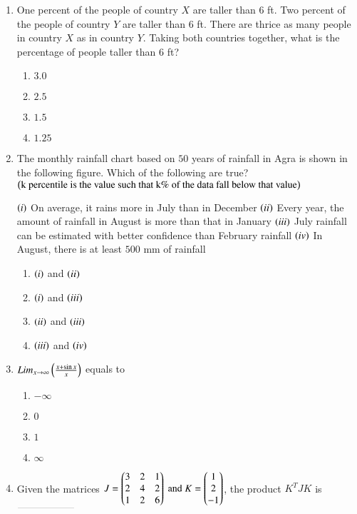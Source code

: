 \documentclass[journal,12pt,onecolumn]{IEEEtran}
\theoremstyle{remark}
\begin{document}
\begin{enumerate}
\item One percent of the people of country $X$ are taller than $6$ ft. Two percent of the people of country $Y$ are taller than $6$ ft. There are thrice as many people in country $X$ as in country $Y$. Taking both countries together, what is the percentage of people taller than $6$ ft?
\hfill{}
\begin{enumerate}
\item $3.0$
\item $2.5$
\item $1.5$
\item $1.25$
\end{enumerate}

\item The monthly rainfall chart based on $50$ years of rainfall in Agra is shown in the following figure. Which of the following are true? $\left(\text{k percentile is the value such that k\% of the data fall below that value}\right)$
\begin{center}

\end{center}
$\left(i\right)$ On average, it rains more in July than in December
$\left(ii\right)$ Every year, the amount of rainfall in August is more than that in January
$\left(iii\right)$ July rainfall can be estimated with better confidence than February rainfall
$\left(iv\right)$ In August, there is at least $500$ mm of rainfall
\hfill{}
\begin{enumerate}
\item $\left(i\right)$ and $\left(ii\right)$
\item $\left(i\right)$ and $\left(iii\right)$
\item $\left(ii\right)$ and $\left(iii\right)$
\item $\left(iii\right)$ and $\left(iv\right)$
\end{enumerate}

\item $Lim_{x\to \infty} \left(\frac{x+\sin x}{x}\right)$ equals to
\hfill{}
\begin{enumerate}
\item $-\infty$
\item $0$
\item $1$
\item $\infty$
\end{enumerate}

\item Given the matrices $J = \begin{pmatrix}3 & 2 & 1\\2 & 4 & 2\\1 & 2 & 6\end{pmatrix} \text{ and } K = \begin{pmatrix}1\\2\\-1\end{pmatrix}$, the product $K^T JK$ is $\rule{2cm}{0.1pt}$
\hfill{}


\end{enumerate}
\end{document}
